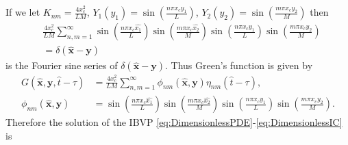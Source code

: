\documentclass[\main/thesis.tex]{subfiles}
\begin{document}
If we let $K_{nm} {=} \frac{4 x_c^2}{LM}$, $Y_1(y_1) {=} \sin\left(\frac{n \pi x_c y_1}{L}\right)$, $Y_2(y_2) {=} \sin\left(\frac{m \pi x_c y_2}{M}\right)$ then
\begin{align*}
    &\frac{4 x_c^2}{LM} \sum_{n, m {=} 1}^{\infty} \sin\left(\frac{n \pi x_c \hat{x_1}}{L}\right)
	                                               \sin\left(\frac{m \pi x_c \hat{x_2}}{M}\right)
	                                              \sin\left(\frac{n \pi x_c y_1}{L}\right)
	                                              \sin\left(\frac{m \pi x_c y_2}{M}\right)\\
    &{=} \delta(\boldsymbol{\hat{x}} {-} \boldsymbol{y})
\end{align*}
is the Fourier sine series of $\delta(\boldsymbol{\hat{x}} - \boldsymbol{y})$.
Thus Green's function is given by
\begin{align}
G(\boldsymbol{\hat{x}}, \boldsymbol{y}, \hat{t}{-}\tau) &{=} \frac{4 x_c^2}{LM} \sum_{n, m {=} 1}^{\infty} \phi_{nm}(\boldsymbol{\hat{x}}, \boldsymbol{y}) \eta_{nm}(\hat{t}{-}\tau),
\label{eq:Greens_func}\\
\phi_{nm}(\boldsymbol{\hat{x}}, \boldsymbol{y}) &{=} \sin\left(\frac{n \pi x_c \hat{x_1}}{L}\right)
	                                           \sin\left(\frac{m \pi x_c \hat{x_2}}{M}\right)
	                                           \sin\left(\frac{n \pi x_c y_1}{L}\right)
	                                           \sin\left(\frac{m \pi x_c y_2}{M}\right).
\nonumber
\end{align}
Therefore the solution of the IBVP \eqref{eq:DimensionlessPDE}-\eqref{eq:DimensionlessIC} is
\end{document}
